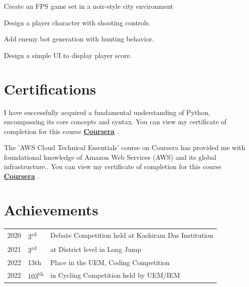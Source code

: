 \documentclass[]{swapnanil-resume}
\begin{document}
\begin{minipage}[t]{0.66\textwidth}
\begin{tightemize}
\item Create an FPS game set in a noir-style city environment
\item Design a player character with shooting controls.
\item Add enemy bot generation with hunting behavior.
\item Design a simple UI to display player score.
\end{tightemize}
\sectionsep

\section{Certifications}
I have successfully acquired a fundamental understanding of Python, encompassing its core concepts and syntax. You can view my certificate of completion for this course \textbf{\href{https://coursera.org/share/b71698928aaa068338abf1bd936cc1b3}{Coursera}} .

The 'AWS Cloud Technical Essentials' course on Coursera has provided me with foundational knowledge of Amazon Web Services (AWS) and its global infrastructure.. You can view my certificate of completion for this course \textbf{\href{https://coursera.org/share/5fca237b7c7400c97aad8745162c9c29}{Coursera}} .
\sectionsep

\section{Achievements} 
\begin{tabular}{rll}
2020	     & 3\textsuperscript{rd} & Debate Competition held at Kashiram Das Institution\\
2021     & 3\textsuperscript{rd} & at District level in Long Jump  \\
2022	     & 13th  & Place in the UEM, Coding Competition\\
2022     & 103\textsuperscript{th} & in Cycling Competition held by UEM/IEM \\
\end{tabular}
\sectionsep

\end{minipage} 
\end{document}
